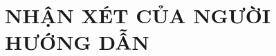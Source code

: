 \documentclass[11pt]{report}
\begin{document}
	\chapter*{NHẬN XÉT CỦA NGƯỜI HƯỚNG DẪN}
	\dotfill\\\dotfill\\\dotfill\\\dotfill\\\dotfill
	\\\dotfill\\\dotfill\\\dotfill\\\dotfill\\\dotfill
	\\\dotfill\\\dotfill\\\dotfill\\\dotfill\\\dotfill
	\\\dotfill\\\dotfill\\\dotfill\\\dotfill\\\dotfill
	\\\dotfill\\\dotfill\\\dotfill\\\dotfill\\\dotfill
	\\\dotfill\\\dotfill\\\dotfill\\\dotfill\\\dotfill
	\\\dotfill\\\dotfill\\\dotfill\\
	\pagebreak
	
\end{document}
